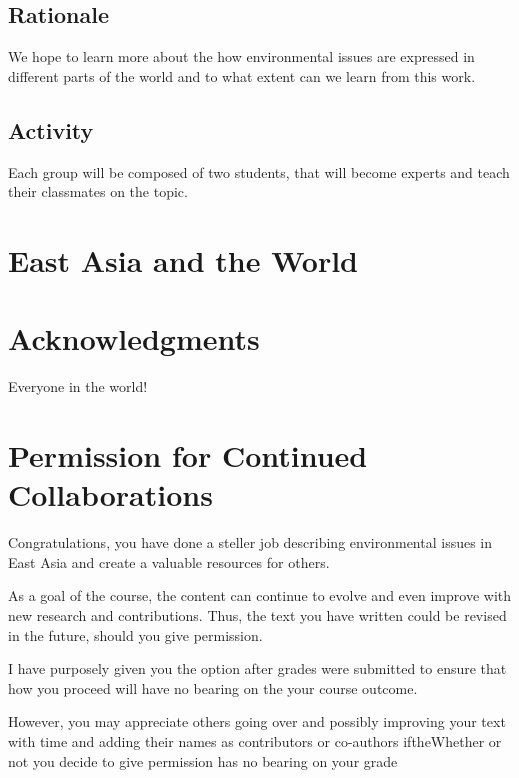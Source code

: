 \documentclass{book}\usepackage{knitr}
\begin{document}
\subsection*{Rationale}

We hope to learn more about the how environmental issues are expressed in different parts of the world and to what extent can we learn from this work. 

\subsection*{Activity}

Each group will be composed of two students, that will become experts and teach their classmates on the topic. 

\section*{East Asia and the World}







\section*{Acknowledgments}

Everyone in the world!




\newpage

\section*{Permission for Continued Collaborations}

Congratulations, you have done a steller job describing environmental issues in East Asia and create a valuable resources for others. 

As a goal of the course, the content can continue to evolve and even improve with new research and contributions. Thus, the text you have written could be revised in the future, should you give permission. 

I have purposely given you the option after grades were submitted to ensure that how you proceed will have no bearing on the your course outcome.

However, you may appreciate others going over and possibly improving your text with time and adding their names as contributors or co-authors iftheWhether or not you decide to give permission has no bearing on your grade
\end{document}
